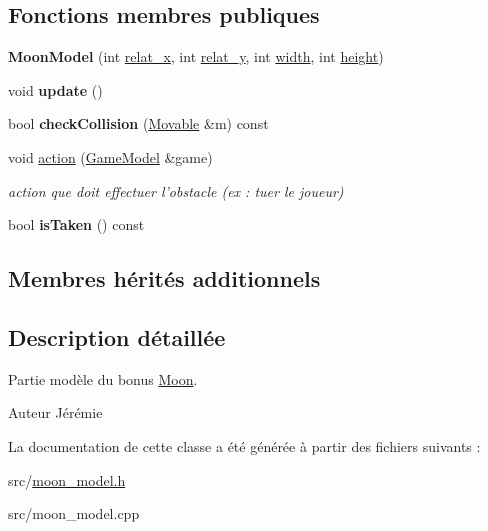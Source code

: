 \subsection*{Fonctions membres publiques}
\begin{DoxyCompactItemize}
\item 
\hypertarget{class_moon_model_ae77017055a7d86bc32fd0cef9b728529}{{\bfseries Moon\+Model} (int \hyperlink{class_obstacle_a37056563c8469b38aa240c7c423d7280}{relat\+\_\+x}, int \hyperlink{class_obstacle_a754f463db00e74fd5d66a758e4458c26}{relat\+\_\+y}, int \hyperlink{class_movable_a7e4607cccfcc96d2007c2e39c44cab54}{width}, int \hyperlink{class_movable_a192073065bc62d054f259c3b1522c09e}{height})}\label{class_moon_model_ae77017055a7d86bc32fd0cef9b728529}

\item 
\hypertarget{class_moon_model_ab1c85799e1398d45d89ab95a41d0ba22}{void {\bfseries update} ()}\label{class_moon_model_ab1c85799e1398d45d89ab95a41d0ba22}

\item 
\hypertarget{class_moon_model_a0c269271fd4055d2a9dd65bcf1664785}{bool {\bfseries check\+Collision} (\hyperlink{class_movable}{Movable} \&m) const }\label{class_moon_model_a0c269271fd4055d2a9dd65bcf1664785}

\item 
\hypertarget{class_moon_model_a32c428fa62cf01215eaa28e79be28182}{void \hyperlink{class_moon_model_a32c428fa62cf01215eaa28e79be28182}{action} (\hyperlink{class_game_model}{Game\+Model} \&game)}\label{class_moon_model_a32c428fa62cf01215eaa28e79be28182}

\begin{DoxyCompactList}\small\item\em action que doit effectuer l'obstacle (ex \+: tuer le joueur) \end{DoxyCompactList}\item 
\hypertarget{class_moon_model_a1aa35ec6b07d8baf5d3e7fd479bb931a}{bool {\bfseries is\+Taken} () const }\label{class_moon_model_a1aa35ec6b07d8baf5d3e7fd479bb931a}

\end{DoxyCompactItemize}
\subsection*{Membres hérités additionnels}


\subsection{Description détaillée}
Partie modèle du bonus \hyperlink{class_moon}{Moon}. 

\begin{DoxyAuthor}{Auteur}
Jérémie 
\end{DoxyAuthor}


La documentation de cette classe a été générée à partir des fichiers suivants \+:\begin{DoxyCompactItemize}
\item 
src/\hyperlink{moon__model_8h}{moon\+\_\+model.\+h}\item 
src/moon\+\_\+model.\+cpp\end{DoxyCompactItemize}
